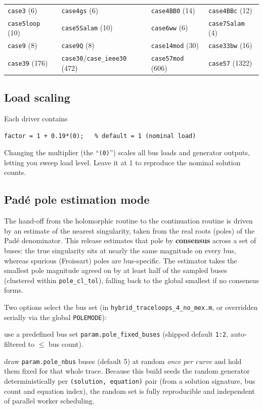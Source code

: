 \documentclass[11pt,a4paper]{article}
\newcommand{\code}[1]{\texttt{#1}}
\begin{document}
\begin{center}\small
\begin{tabular}{@{}llll@{}}
\toprule
\code{case3} (6) & \code{case4gs} (6) & \code{case4BB0} (14) & \code{case4BBc} (12)\\
\code{case5loop} (10) & \code{case5Salam} (10) & \code{case6ww} (6) & \code{case7Salam} (4)\\
\code{case9} (8) & \code{case9Q} (8) & \code{case14mod} (30) & \code{case33bw} (16)\\
\code{case39} (176) & \code{case30}/\code{case_ieee30} (472) & \code{case57mod} (606) & \code{case57} (1322)\\
\bottomrule
\end{tabular}
\end{center}

\subsection{Load scaling}
Each driver contains
\begin{lstlisting}[style=mat]
factor = 1 + 0.19*(0);   % default = 1 (nominal load)
\end{lstlisting}
Changing the multiplier (the ``\code{(0)}'') scales all bus loads and generator outputs,
letting you sweep load level. Leave it at 1 to reproduce the nominal solution counts.

\subsection{Pad\'e pole estimation mode}\label{sec:pole}
The hand-off from the holomorphic routine to the continuation routine is driven by an
estimate of the nearest singularity, taken from the real roots (poles) of the Pad\'e
denominator. This release estimates that pole by \textbf{consensus} across a set of
buses: the true singularity sits at nearly the same magnitude on every bus, whereas
spurious (Froissart) poles are bus-specific. The estimator takes the smallest pole
magnitude agreed on by at least half of the sampled buses (clustered within
\code{pole_cl_tol}), falling back to the global smallest if no consensus forms.

Two options select the bus set (in \code{hybrid_traceloops_4_no_mex.m}, or overridden
serially via the global \code{POLEMODE}):

\begin{description}[leftmargin=0em,style=nextline]
\item[\code{'fixed'} (option 1, shipped default)] use a predefined bus set
      \code{param.pole_fixed_buses} (shipped default \code{1:2}, auto-filtered to $\le$ bus
      count).
\item[\code{'random'} (option 2)] draw \code{param.pole_nbus} buses (default 5) at random
      \emph{once per curve} and hold them fixed for that whole trace. Because this build
      seeds the random generator deterministically per \code{(solution, equation)} pair
      (from a solution signature, bus count and equation index), the random set is fully
      reproducible and independent of parallel worker scheduling.
\end{description}
\end{document}
